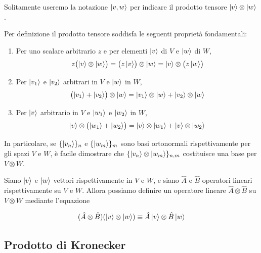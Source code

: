 Solitamente useremo la notazione $\ket{v, w}$ per indicare il prodotto tensore $\ket{v} \otimes \ket{w}$. 

Per definizione il prodotto tensore soddisfa le seguenti proprietà fondamentali:
%
\begin{enumerate}[label=(\arabic*)]
    \item Per uno scalare arbitrario $z$ e per elementi $\ket{v}$ di $V$ e $\ket{w}$ di $W$,
    \begin{equation}
        z \bigl( \ket{v} \otimes \ket{w} \bigr) = \bigl( z\ket{v} \bigr) \otimes \ket{w} = \ket{v} \otimes \bigl( z\ket{w} \bigr)
        \label{eq:tensore-scalare}
    \end{equation}
    \item Per $\ket{v_1}$ e $\ket{v_2}$ arbitrari in $V$ e $\ket{w}$ in $W$,
    \begin{equation}
        \bigl( \ket{v_1} + \ket{v_2} \bigr) \otimes \ket{w} = \ket{v_1} \otimes \ket{w} + \ket{v_2} \otimes \ket{w}
        \label{eq:tensore-additiva-sx}
    \end{equation}
    \item Per $\ket{v}$ arbitrario in $V$ e $\ket{w_1}$ e $\ket{w_2}$ in $W$,
    \begin{equation}
        \ket{v} \otimes \bigl( \ket{w_1} + \ket{w_2} \bigr) = \ket{v} \otimes \ket{w_1} + \ket{v} \otimes \ket{w_2}
        \label{eq:tensore-additiva-dx}
    \end{equation}
\end{enumerate}

In particolare, se $\{\ket{v_n}\}_n$ e $\{\ket{w_m}\}_m$ sono basi ortonormali rispettivamente per gli spazi $V$ e $W$, è facile dimostrare che $\{\ket{v_n} \otimes \ket{w_m}\}_{n,m}$ costituisce una base per $V \otimes W$.

Siano $\ket{v}$ e $\ket{w}$ vettori rispettivamente in $V$ e $W$, e siano $\hat{A}$ e $\hat{B}$ operatori lineari rispettivamente su $V$ e $W$. Allora possiamo definire un operatore lineare $\hat{A} \otimes \hat{B}$ su $V \otimes W$ mediante l'equazione
\begin{tcolorbox}[colback=black!5!white, colframe=black!45!white, boxrule=0.8pt]
\begin{equation}
    (\hat{A}\otimes \hat{B}) (\ket{v} \otimes \ket{w}) \equiv \hat{A}\ket{v} \otimes \hat{B} \ket{w}
\end{equation}
\end{tcolorbox}

\subsection{Prodotto di Kronecker}

